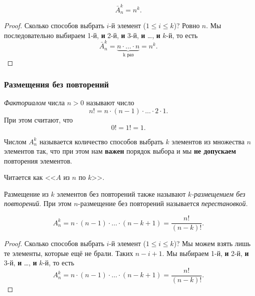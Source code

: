 \begin{theorem}
	\[
		\bar{A}_n^k = n^k.
	\]
\end{theorem}

\begin{proof}
	Сколько способов выбрать $i$-й элемент ($1 \le i \le k$)? Ровно $n$. Мы последовательно выбираем 1-й, \textbf{и} 2-й, \textbf{и} 3-й, \textbf{и} \dots, \textbf{и} $k$-й, то есть
	\[
		\bar{A}_n^k = \underbrace{n \cdot \ldots \cdot n}_{\text{k раз}} = n^k.
	\]
\end{proof}

\subsubsection*{Размещения без повторений}

\begin{definition}
	\textit{Факториалом} числа $n > 0$ называют число
	\[
		n! = n \cdot (n - 1) \cdot \ldots \cdot 2 \cdot 1.
	\]
	При этом считают, что
	\[
		0! = 1! = 1.
	\]
\end{definition}

\begin{definition}
	Числом $A_n^k$ называется количество способов выбрать $k$ элементов из множества $n$ элементов так, что при этом нам \textbf{важен} порядок выбора и мы \textbf{не допускаем} повторения элементов.
\end{definition}

\begin{note}
	Читается как <<$A$ из $n$ по $k$>>.
\end{note}

\begin{note}
	Размещение из $k$ элементов без повторений также называют \textit{$k$-размещением без повторений}.
	При этом $n$-размещение без повторений называется \textit{перестановкой}.
\end{note}

\begin{theorem}
	\[
		A_n^k = n \cdot (n - 1) \cdot \ldots \cdot (n - k + 1) = \frac{n!}{(n - k)!}.
	\]
\end{theorem}

\begin{proof}
	Сколько способов выбрать $i$-й элемент ($1 \le i \le k$)? Мы можем взять лишь те элементы, которые ещё не брали. Таких $n - i + 1$. Мы выбираем 1-й, \textbf{и} 2-й, \textbf{и} 3-й, \textbf{и} \dots, \textbf{и} $k$-й, то есть
	\[
		A_n^k = n \cdot (n - 1) \cdot \ldots \cdot (n - k + 1) = \frac{n!}{(n - k)!}.
	\]
\end{proof}

